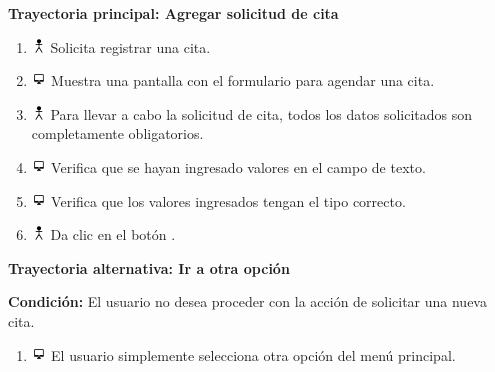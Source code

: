 \textbf{Trayectoria principal: Agregar solicitud de cita}
\begin{enumerate}
\item \includegraphics[height=1em]{pictures/actor.png} Solicita registrar una cita.
\item \includegraphics[height=1em]{pictures/sistema.png} Muestra una pantalla con el formulario para agendar una cita.
\item \includegraphics[height=1em]{pictures/actor.png} Para llevar a cabo la solicitud de cita, todos los datos solicitados son completamente obligatorios.
\item \includegraphics[height=1em]{pictures/sistema.png} Verifica que se hayan ingresado valores en el campo de texto.
\item \includegraphics[height=1em]{pictures/sistema.png} Verifica que los valores ingresados tengan el tipo correcto.
\item \includegraphics[height=1em]{pictures/actor.png} Da clic en el botón .
\end{enumerate} \bigskip

\textbf{Trayectoria alternativa: Ir a otra opción} 

\vspace{0.3em}

\textbf{Condición:} El usuario no desea proceder con la acción de solicitar una nueva cita.
\begin{enumerate}
\item \includegraphics[height=1em]{pictures/sistema.png} El usuario simplemente selecciona otra opción del menú principal.
\end{enumerate} \bigskip


